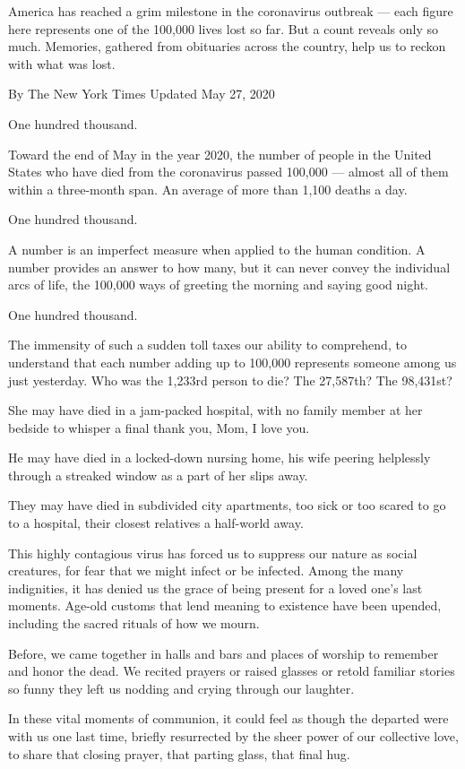 America has reached a grim milestone in the coronavirus outbreak ---
each figure here represents one of the 100,000 lives lost so far. But a
count reveals only so much. Memories, gathered from obituaries across
the country, help us to reckon with what was lost.

By The New York Times Updated May 27, 2020

One hundred thousand.

Toward the end of May in the year 2020, the number of people in the
United States who have died from the coronavirus passed 100,000 ---
almost all of them within a three-month span. An average of more than
1,100 deaths a day.

One hundred thousand.

A number is an imperfect measure when applied to the human condition. A
number provides an answer to how many, but it can never convey the
individual arcs of life, the 100,000 ways of greeting the morning and
saying good night.

One hundred thousand.

The immensity of such a sudden toll taxes our ability to comprehend, to
understand that each number adding up to 100,000 represents someone
among us just yesterday. Who was the 1,233rd person to die? The
27,587th? The 98,431st?

She may have died in a jam-packed hospital, with no family member at her
bedside to whisper a final thank you, Mom, I love you.

He may have died in a locked-down nursing home, his wife peering
helplessly through a streaked window as a part of her slips away.

They may have died in subdivided city apartments, too sick or too scared
to go to a hospital, their closest relatives a half-world away.

This highly contagious virus has forced us to suppress our nature as
social creatures, for fear that we might infect or be infected. Among
the many indignities, it has denied us the grace of being present for a
loved one's last moments. Age-old customs that lend meaning to existence
have been upended, including the sacred rituals of how we mourn.

Before, we came together in halls and bars and places of worship to
remember and honor the dead. We recited prayers or raised glasses or
retold familiar stories so funny they left us nodding and crying through
our laughter.

In these vital moments of communion, it could feel as though the
departed were with us one last time, briefly resurrected by the sheer
power of our collective love, to share that closing prayer, that parting
glass, that final hug.

